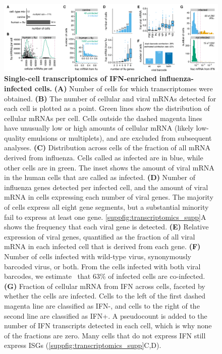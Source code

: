 \documentclass[10pt,letterpaper]{article}
\newenvironment{fullwidth}{%
  \begin{adjustwidth}{-2.05in}{}
}{\end{adjustwidth}}
\newcommand{\SUPPFIG}[1]{\autoref{suppfig:#1}}
\begin{document}
\begin{figure}
\begin{fullwidth}

\includegraphics[width=\linewidth, clip=false]{figures/single_cell_figures/p_cell_summary.pdf}

\caption{
{\bf Single-cell transcriptomics of IFN-enriched influenza-infected cells.}
{\bf (A)} 
Number of cells for which transcriptomes were obtained.
{\bf (B)} The number of cellular and viral mRNAs detected for each cell is plotted as a point.
Green lines show the distribution of cellular mRNAs per cell.
Cells outside the dashed magenta lines have unusually low or high amounts of cellular mRNA (likely low-quality emulsions or multiplets), and are excluded from subsequent analyses.
{\bf (C)} Distribution across cells of the fraction of all mRNA derived from influenza.
Cells called as infected are in blue, while other cells are in green.
The inset shows the amount of viral mRNA in the human cells that are called as infected.
{\bf (D)} Number of influenza genes detected per infected cell, and the amount of viral mRNA in cells expressing each number of viral genes.
The majority of cells express all eight gene segments, but a substantial minority fail to express at least one gene.
\SUPPFIG{transcriptomics_supp}A shows the frequency that each viral gene is detected.
{\bf (E)} Relative expression of viral genes, quantified as the fraction of all viral mRNA in each infected cell that is derived from each gene.
{\bf (F)} Number of cells infected with wild-type virus, synonymously barcoded virus, or both.
From the cells infected with both viral barcodes, we estimate~\citep{bloom2018estimating} that 63\% of infected cells are co-infected.
{\bf (G)} Fraction of cellular mRNA from IFN across cells, faceted by whether the cells are infected.
Cells to the left of the first dashed magenta line are classified as IFN-, and cells to the right of the second line are classified as IFN+.
A pseudocount is added to the number of IFN transcripts detected in each cell, which is why none of the fractions are zero.
Many cells that do not express IFN still express ISGs (\SUPPFIG{transcriptomics_supp}C,D).
}
\label{fig:transcriptomics}

\end{fullwidth}
\end{figure}
\end{document}
